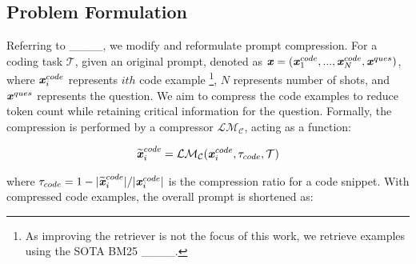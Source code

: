 \subsection{Problem Formulation}
Referring to ____, we modify and reformulate prompt compression. For a coding task $\mathcal{T}$, given an original prompt, denoted as $\textbf{\textit{x}} = (\textbf{\textit{x}}_1^{code}, ..., \textbf{\textit{x}}_N^{code}, \textbf{\textit{x}}^{ques})$, where $\textbf{\textit{x}}_i^{code}$ represents $ith$ code example \footnote{As improving the retriever is not the focus of this work, we retrieve examples using the SOTA BM25 ____.}, $N$ represents number of shots, and $\textbf{\textit{x}}^{ques}$ represents the question. We aim to compress the code examples to reduce token count while retaining critical information for the question. Formally, the compression is performed by a compressor $\mathcal{LM_C}$, acting as a function:

\setlength{\abovedisplayskip}{7pt} %
\setlength{\belowdisplayskip}{5pt} %
\begin{align}
\widetilde{\textbf{\textit{x}}}_i^{code}=\mathcal{LM_C}(\textbf{\textit{x}}_i^{code},\tau_{code}, \mathcal{T})
\end{align}\label{eq:lmc}

\noindent where $\tau_{code}=1-|\widetilde{\textbf{\textit{x}}}_i^{code}|/|\textbf{\textit{x}}_i^{code}|$ is the compression ratio for a code snippet. With compressed code examples, the overall prompt is shortened as:

